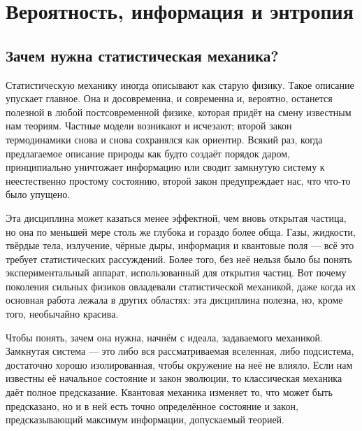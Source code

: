 \chapter{Вероятность, информация и энтропия}


\section{Зачем нужна статистическая механика?}

Статистическую механику иногда описывают как старую физику. Такое описание упускает главное. Она и досовременна, и современна и, вероятно, останется полезной в любой постсовременной физике, которая придёт на смену известным нам теориям. Частные модели возникают и исчезают; второй закон термодинамики снова и снова сохранялся как ориентир. Всякий раз, когда предлагаемое описание природы как будто создаёт порядок даром, принципиально уничтожает информацию или сводит замкнутую систему к неестественно простому состоянию, второй закон предупреждает нас, что что-то было упущено.

Эта дисциплина может казаться менее эффектной, чем вновь открытая частица, но она по меньшей мере столь же глубока и гораздо более обща. Газы, жидкости, твёрдые тела, излучение, чёрные дыры, информация и квантовые поля — всё это требует статистических рассуждений. Более того, без неё нельзя было бы понять экспериментальный аппарат, использованный для открытия частиц. Вот почему поколения сильных физиков овладевали статистической механикой, даже когда их основная работа лежала в других областях: эта дисциплина полезна, но, кроме того, необычайно красива.

Чтобы понять, зачем она нужна, начнём с идеала, задаваемого механикой. Замкнутая система — это либо вся рассматриваемая вселенная, либо подсистема, достаточно хорошо изолированная, чтобы окружение на неё не влияло. Если нам известны её начальное состояние и закон эволюции, то классическая механика даёт полное предсказание. Квантовая механика изменяет то, что может быть предсказано, но и в ней есть точно определённое состояние и закон, предсказывающий максимум информации, допускаемый теорией.

